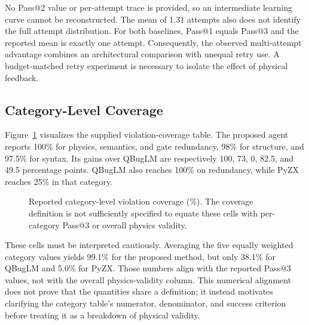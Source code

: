 \documentclass[conference]{IEEEtran}
\begin{document}
No Pass@2 value or per-attempt trace is provided, so an intermediate learning curve cannot be reconstructed. The mean of 1.31 attempts also does not identify the full attempt distribution. For both baselines, Pass@1 equals Pass@3 and the reported mean is exactly one attempt. Consequently, the observed multi-attempt advantage combines an architectural comparison with unequal retry use. A budget-matched retry experiment is necessary to isolate the effect of physical feedback.

\subsection{Category-Level Coverage}
Figure~\ref{fig:coverage} visualizes the supplied violation-coverage table. The proposed agent reports 100\% for physics, semantics, and gate redundancy, 98\% for structure, and 97.5\% for syntax. Its gains over QBugLM are respectively 100, 73, 0, 82.5, and 49.5 percentage points. QBugLM also reaches 100\% on redundancy, while PyZX reaches 25\% in that category.

\begin{figure}[t]
\centering
{}
\caption{Reported category-level violation coverage (\%). The coverage definition is not sufficiently specified to equate these cells with per-category Pass@3 or overall physics validity.}
\label{fig:coverage}
\end{figure}

These cells must be interpreted cautiously. Averaging the five equally weighted category values yields 99.1\% for the proposed method, but only 38.1\% for QBugLM and 5.0\% for PyZX. Those numbers align with the reported Pass@3 values, not with the overall physics-validity column. This numerical alignment does not prove that the quantities share a definition; it instead motivates clarifying the category table's numerator, denominator, and success criterion before treating it as a breakdown of physical validity.
\end{document}
